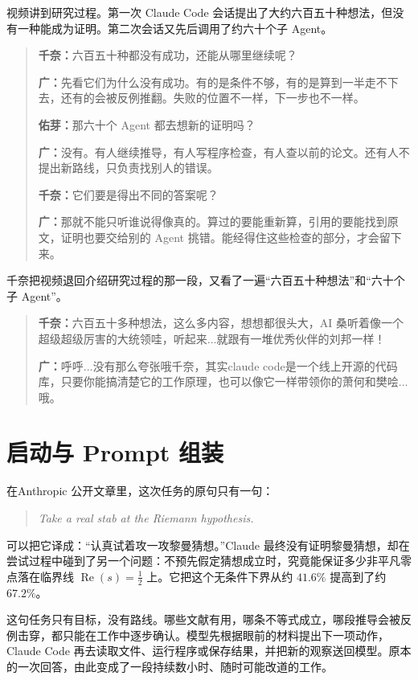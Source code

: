 视频讲到研究过程。第一次 Claude Code 会话提出了大约六百五十种想法，但没有一种能成为证明。第二次会话又先后调用了约六十个子 Agent。

\begin{quote}
\textbf{千奈：}六百五十种都没有成功，还能从哪里继续呢？

\textbf{广：}先看它们为什么没有成功。有的是条件不够，有的是算到一半走不下去，还有的会被反例推翻。失败的位置不一样，下一步也不一样。

\textbf{佑芽：}那六十个 Agent 都去想新的证明吗？

\textbf{广：}没有。有人继续推导，有人写程序检查，有人查以前的论文。还有人不提出新路线，只负责找别人的错误。

\textbf{千奈：}它们要是得出不同的答案呢？

\textbf{广：}那就不能只听谁说得像真的。算过的要能重新算，引用的要能找到原文，证明也要交给别的 Agent 挑错。能经得住这些检查的部分，才会留下来。
\end{quote}

千奈把视频退回介绍研究过程的那一段，又看了一遍“六百五十种想法”和“六十个子 Agent”。

\begin{quote}
\textbf{千奈：}六百五十多种想法，这么多内容，想想都很头大，AI 桑听着像一个超级超级厉害的大统领哇，听起来...就跟有一堆优秀伙伴的刘邦一样！

\textbf{广：}呼呼...没有那么夸张哦千奈，其实claude code是一个线上开源的代码库，只要你能搞清楚它的工作原理，也可以像它一样带领你的萧何和樊哙...哦。
\end{quote}

\section{启动与 Prompt 组装}

在Anthropic 公开文章里，这次任务的原句只有一句：

\begin{quote}
\textit{Take a real stab at the Riemann hypothesis.}
\end{quote}

可以把它译成：“认真试着攻一攻黎曼猜想。”Claude 最终没有证明黎曼猜想，却在尝试过程中碰到了另一个问题：不预先假定猜想成立时，究竟能保证多少非平凡零点落在临界线 $\operatorname{Re}(s)=\tfrac12$ 上。它把这个无条件下界从约 $41.6\%$ 提高到了约 $67.2\%$。\cite{ch03riemannweb,ch03riemannpaper}

这句任务只有目标，没有路线。哪些文献有用，哪条不等式成立，哪段推导会被反例击穿，都只能在工作中逐步确认。模型先根据眼前的材料提出下一项动作，Claude Code 再去读取文件、运行程序或保存结果，并把新的观察送回模型。原本的一次回答，由此变成了一段持续数小时、随时可能改道的工作。\cite{ch03riemannweb,ch03inside,ch03react}

